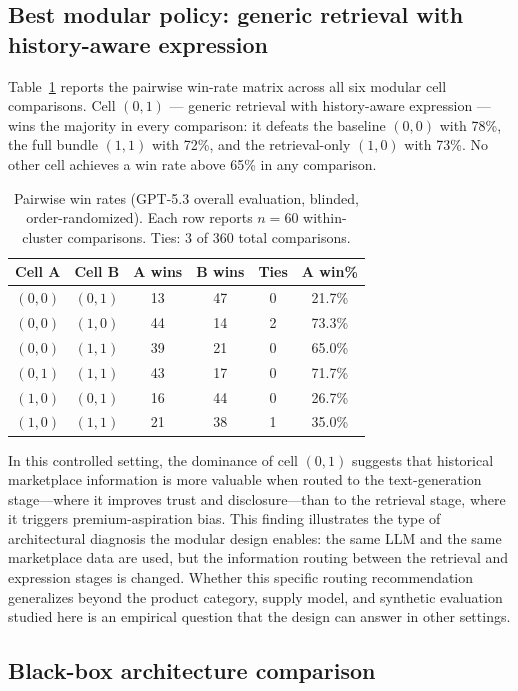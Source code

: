 \documentclass[11pt]{article}
\begin{document}
\subsection{Best modular policy: generic retrieval with history-aware expression}

Table~\ref{table:pairwise-wins} reports the pairwise win-rate matrix across all six modular cell comparisons. Cell $(0,1)$ --- generic retrieval with history-aware expression --- wins the majority in every comparison: it defeats the baseline $(0,0)$ with 78\%, the full bundle $(1,1)$ with 72\%, and the retrieval-only $(1,0)$ with 73\%. No other cell achieves a win rate above 65\% in any comparison.

\begin{table}[t]
\centering
\caption{Pairwise win rates (GPT-5.3 overall evaluation, blinded, order-randomized). Each row reports $n = 60$ within-cluster comparisons. Ties: 3 of 360 total comparisons.}
\label{table:pairwise-wins}
\small
\begin{tabular}{cccccc}
\toprule
Cell A & Cell B & A wins & B wins & Ties & A win\% \\
\midrule
$(0,0)$ & $(0,1)$ & 13 & 47 & 0 & 21.7\% \\
$(0,0)$ & $(1,0)$ & 44 & 14 & 2 & 73.3\% \\
$(0,0)$ & $(1,1)$ & 39 & 21 & 0 & 65.0\% \\
$(0,1)$ & $(1,1)$ & 43 & 17 & 0 & 71.7\% \\
$(1,0)$ & $(0,1)$ & 16 & 44 & 0 & 26.7\% \\
$(1,0)$ & $(1,1)$ & 21 & 38 & 1 & 35.0\% \\
\bottomrule
\end{tabular}
\end{table}

In this controlled setting, the dominance of cell $(0,1)$ suggests that historical marketplace information is more valuable when routed to the text-generation stage---where it improves trust and disclosure---than to the retrieval stage, where it triggers premium-aspiration bias. This finding illustrates the type of architectural diagnosis the modular design enables: the same LLM and the same marketplace data are used, but the information routing between the retrieval and expression stages is changed. Whether this specific routing recommendation generalizes beyond the product category, supply model, and synthetic evaluation studied here is an empirical question that the design can answer in other settings.

\subsection{Black-box architecture comparison}\label{section:bb-diagnostic}
\end{document}

